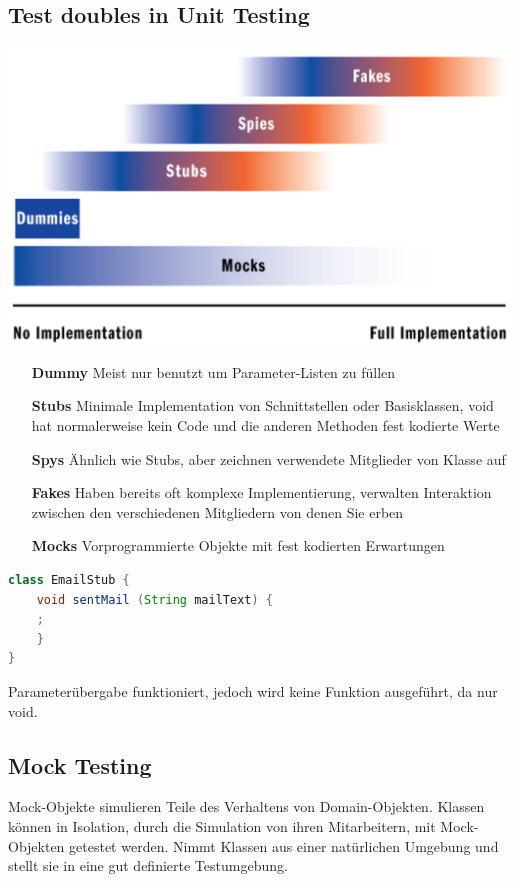 \documentclass[a4paper,10pt]{article}
\newcommand{\Bold}[1]{\textbf{#1}} %
\begin{document}
\subsection{Test doubles in Unit Testing}
\includegraphics[scale=0.8]{test_doubles.png}
\begin{itemize}
	\item[\Bold {Dummy}] Meist nur benutzt um Parameter-Listen zu füllen 
	\item[\Bold {Stubs}] Minimale Implementation von Schnittstellen oder Basisklassen, void hat normalerweise kein Code und die anderen Methoden fest kodierte Werte
	\item[\Bold {Spys}]	 	Ähnlich wie Stubs, aber zeichnen verwendete Mitglieder von Klasse auf
	\item[\Bold {Fakes}]	Haben bereits oft komplexe Implementierung, verwalten Interaktion zwischen den verschiedenen Mitgliedern von denen Sie erben
	\item[\Bold {Mocks}] 	Vorprogrammierte Objekte mit fest kodierten Erwartungen
\end{itemize}
\begin{lstlisting}[language=Java,caption=Beispiel von Stub, style=MyJavaStyle]
class EmailStub {
    void sentMail (String mailText) {
    ;
    }
}
\end{lstlisting}
Parameterübergabe funktioniert, jedoch wird keine Funktion ausgeführt, da nur void.

\subsection{Mock Testing}
Mock-Objekte simulieren Teile des Verhaltens von Domain-Objekten. Klassen können in Isolation, durch die Simulation von ihren Mitarbeitern, mit Mock-Objekten getestet werden. Nimmt Klassen aus einer natürlichen Umgebung und stellt sie in eine gut definierte Testumgebung.
\end{document}
